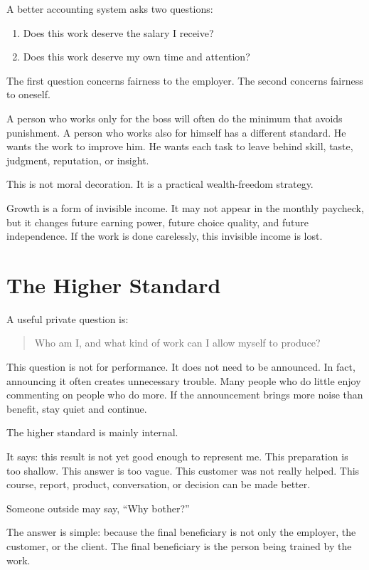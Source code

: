 A better accounting system asks two questions:

\begin{enumerate}
\item Does this work deserve the salary I receive?
\item Does this work deserve my own time and attention?
\end{enumerate}

The first question concerns fairness to the employer. The second concerns fairness to oneself.

A person who works only for the boss will often do the minimum that avoids punishment. A person who works also for himself has a different standard. He wants the work to improve him. He wants each task to leave behind skill, taste, judgment, reputation, or insight.

This is not moral decoration. It is a practical wealth-freedom strategy.

Growth is a form of invisible income. It may not appear in the monthly paycheck, but it changes future earning power, future choice quality, and future independence. If the work is done carelessly, this invisible income is lost.

\section*{The Higher Standard}

A useful private question is:

\begin{quote}
Who am I, and what kind of work can I allow myself to produce?
\end{quote}

This question is not for performance. It does not need to be announced. In fact, announcing it often creates unnecessary trouble. Many people who do little enjoy commenting on people who do more. If the announcement brings more noise than benefit, stay quiet and continue.

The higher standard is mainly internal.

It says: this result is not yet good enough to represent me. This preparation is too shallow. This answer is too vague. This customer was not really helped. This course, report, product, conversation, or decision can be made better.

Someone outside may say, ``Why bother?''

The answer is simple: because the final beneficiary is not only the employer, the customer, or the client. The final beneficiary is the person being trained by the work.

